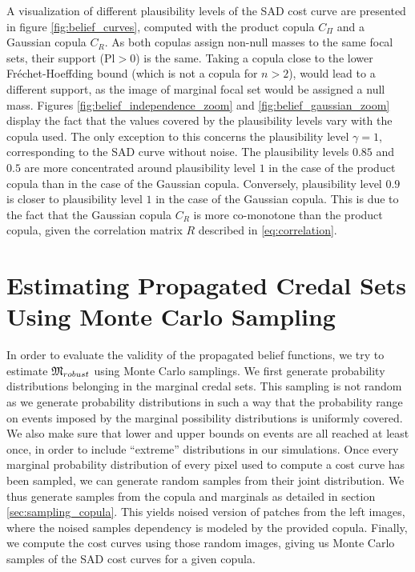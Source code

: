 A visualization of different plausibility levels of the SAD cost curve are presented in figure \ref{fig:belief_curves}, computed with the product copula $C_\Pi$ and a Gaussian copula $C_R$. As both copulas assign non-null masses to the same focal sets, their support ($\mathrm{Pl}>0$) is the same. Taking a copula close to the lower Fréchet-Hoeffding bound (which is not a copula for $n>2$), would lead to a different support, as the image of marginal focal set would be assigned a null mass. Figures \ref{fig:belief_independence_zoom} and \ref{fig:belief_gaussian_zoom} display the fact that the values covered by the plausibility levels vary with the  copula used. The only exception to this concerns the plausibility level $\gamma=1$, corresponding to the SAD curve without noise. The plausibility levels $0.85$ and $0.5$ are more concentrated around plausibility level $1$ in the case of the product copula than in the case of the Gaussian copula. Conversely, plausibility level $0.9$ is closer to plausibility level $1$ in the case of the Gaussian copula. This is due to the fact that the Gaussian copula $C_R$ is more co-monotone than the product copula, given the correlation matrix $R$ described in \eqref{eq:correlation}.

\section{Estimating Propagated Credal Sets Using Monte Carlo Sampling}\label{sec:montecarlo}
In order to evaluate the validity of the propagated belief functions, we try to estimate ${\mathfrak{M}}_{robust}$ using Monte Carlo samplings. We first generate probability distributions belonging in the marginal credal sets. This sampling is not random as we generate probability distributions in such a way that the probability range on events imposed by the marginal possibility distributions is uniformly covered. We also make sure that lower and upper bounds on events are all reached at least once, in order to include ``extreme'' distributions in our simulations. Once every marginal probability distribution of every pixel used to compute a cost curve has been sampled, we can generate random samples from their joint distribution. We thus generate samples from the copula and marginals as detailed in section \ref{sec:sampling_copula}. This yields noised version of patches from the left images, where the noised samples dependency is modeled by the provided copula. Finally, we compute the cost curves using those random images, giving us Monte Carlo samples of the SAD cost curves for a given copula.


